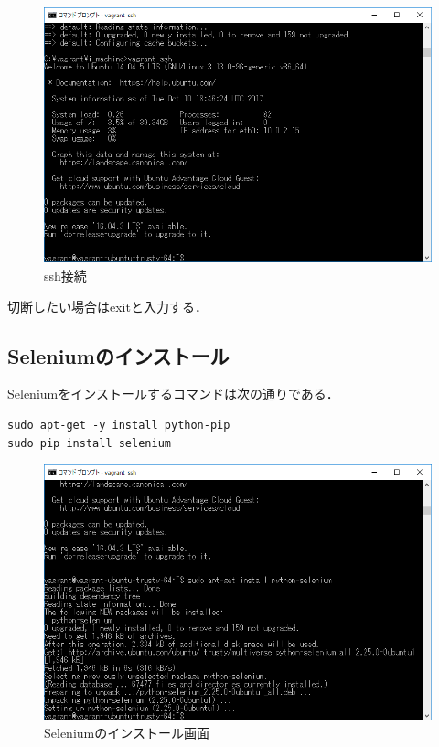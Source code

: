 \newpage
\begin{figure}[htb]
\centering
\includegraphics[width=13cm]{img/ssh.png}
\caption{ssh接続}
\end{figure}
切断したい場合はexitと入力する．
\newpage

\subsection{Seleniumのインストール}
Seleniumをインストールするコマンドは次の通りである．
\begin{lstlisting}[basicstyle=\ttfamily\footnotesize, frame=single]
sudo apt-get -y install python-pip
sudo pip install selenium
\end{lstlisting}
\begin{figure}[htb]
\centering
\includegraphics[width=13cm]{img/selenium.png}
\caption{Seleniumのインストール画面}
\end{figure}

